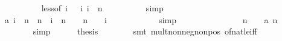 \begin{isabellebody}
\ \ \ \ \ \ \ \ \isamarkupfalse%
\ less{\isacharparenleft}{}{\isacharparenright}{\isacharbrackleft}of\ i{\isacharbrackright}\ {\isacharbackquoteopen}{}\ {\isasymle}\ i{\isacharbackquoteclose}\ {\isacharbackquoteopen}i\ {\isacharless}\ n{\isacharbackquoteclose}\isanewline
\ \ \ \ \ \ \ \ \isamarkupfalse%
\ simp\isanewline
\ \ \ \ \ \ \isamarkupfalse%
\isanewline
\ \ \ \ \ \ \isamarkupfalse%
\ {\isachardoublequoteopen}a\ i\ {\isacharasterisk}\ {\isacharparenleft}n\ {\isacharslash}\ {\isacharparenleft}n\ {\isacharminus}\ i{\isacharparenright}\ {\isacharminus}\ {\isacharparenleft}n\ {\isacharplus}\ {}{\isacharparenright}\ {\isacharslash}\ {\isacharparenleft}n\ {\isacharplus}\ {}\ {\isacharminus}\ i{\isacharparenright}{\isacharparenright}\ {\isachargreater}\ {}{\isachardoublequoteclose}\isanewline
\ \ \ \ \ \ \ \ \isamarkupfalse%
\ simp\isanewline
\ \ \ \ \isamarkupfalse%
\isanewline
\ \ \ \ \isamarkupfalse%
\isanewline
\ \ \ \ \isamarkupfalse%
\ {\isachardoublequoteopen}{\isacharparenleft}n\ {\isacharplus}\ {}{\isacharparenright}\ {\isacharasterisk}\ a\ n\ {\isachargreater}\ {}{\isachardoublequoteclose}\isanewline
\ \ \ \ \ \ \isamarkupfalse%
\ simp\isanewline
\ \ \ \ \isamarkupfalse%
\ {\isacharquery}thesis\isanewline
\ \ \ \ \ \ \isamarkupfalse%
\ {\isacharparenleft}smt\ mult{\isacharunderscore}nonneg{\isacharunderscore}nonpos\ of{\isacharunderscore}nat{\isacharunderscore}{}{\isacharunderscore}le{\isacharunderscore}iff{\isacharparenright}\isanewline
\ \ \isamarkupfalse%
\ \ \ \ \ \ \ \ \ \ \ \ \ \ \ \ \ \ \ \ \ \ \ \ \ \ \ \ \ \ \ \ \ \ \ \ \ \ \isanewline
{}\isamarkupfalse%
%
\endisatagproof
{\isafoldproof}%
%
\isadelimproof
\isanewline
%
\endisadelimproof
\isanewline
%
\isadelimtheory
\isanewline
%
\endisadelimtheory
%
\isatagtheory
{}\isamarkupfalse%
%
\endisatagtheory
{\isafoldtheory}%
%
\isadelimtheory
%
\endisadelimtheory
%
\end{isabellebody}%
\endinput
